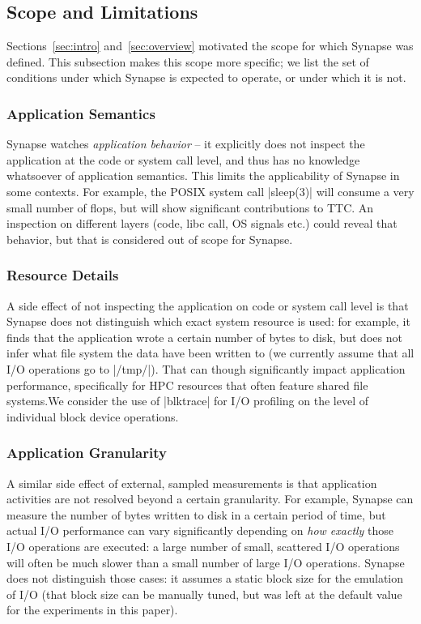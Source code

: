 \documentclass[10pt, conference, compsocconf]{IEEEtran}
\newcommand{\I}[1]{\textit{#1}\xspace}
\newcommand{\synapse}{Synapse\xspace}
\begin{document}
 \subsection{Scope and Limitations}
 \label{sec:limits}

 Sections~\ref{sec:intro} and~\ref{sec:overview} motivated the scope
 for which \synapse was defined.  This subsection makes this scope
 more specific; we list the set of conditions under which
 \synapse is expected to operate, or under which it is not.
 

 \subsubsection{Application Semantics}  \synapse watches
 \I{application behavior} -- it explicitly does not inspect the
 application at the code or system call level, and thus has no
 knowledge whatsoever of application semantics.  This limits the
 applicability of \synapse in some contexts.  For example, the POSIX
 system call |sleep(3)| will consume a very small number of flops, but
 will show significant contributions to TTC.  An inspection on
 different layers (code, libc call, OS signals etc.) could reveal that
 behavior, but that is considered out of scope for \synapse.

 \subsubsection{Resource Details}  A side effect of not inspecting the
 application on code or system call level is that \synapse does not
 distinguish which exact system resource is used: for example, it
 finds that the application wrote a certain number of bytes to disk,
 but does not infer what file system the data have been written to (we
 currently assume that all I/O operations go to |/tmp/|).  That can
 though significantly impact application performance, specifically for
 HPC resources that often feature shared file systems.We consider the
 use of |blktrace| for I/O profiling on the level of individual block
 device operations.

 \subsubsection{Application Granularity}  A similar side effect of
 external, sampled measurements is that application activities are not
 resolved beyond a certain granularity.  For example, \synapse can
 measure the number of bytes written to disk in a certain period of
 time, but actual I/O performance can vary significantly depending on
 \I{how exactly} those I/O operations are executed: a large number of
 small, scattered I/O operations will often be much slower than a
 small number of large I/O operations.  \synapse does not distinguish
 those cases: it assumes a static block size for the emulation of
 I/O (that block size can be manually tuned, but was left at the
 default value for the experiments in this paper).
\end{document}
